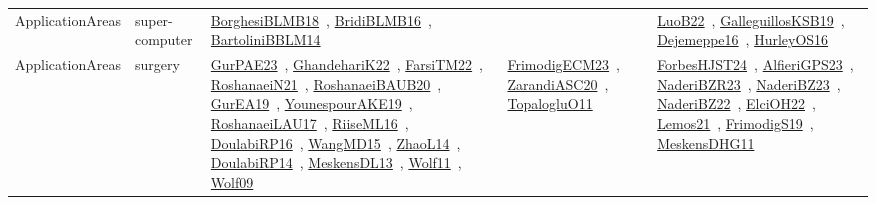 {\begin{longtable}{lp{3cm}>{\raggedright\arraybackslash}p{6cm}>{\raggedright\arraybackslash}p{6cm}>{\raggedright\arraybackslash}p{8cm}}
\index{super-computer}\index{ApplicationAreas!super-computer}ApplicationAreas & super-computer & \href{../works/BorghesiBLMB18.pdf}{BorghesiBLMB18}~\cite{BorghesiBLMB18}, \href{../works/BridiBLMB16.pdf}{BridiBLMB16}~\cite{BridiBLMB16}, \href{../works/BartoliniBBLM14.pdf}{BartoliniBBLM14}~\cite{BartoliniBBLM14} &  & \href{../works/LuoB22.pdf}{LuoB22}~\cite{LuoB22}, \href{../works/GalleguillosKSB19.pdf}{GalleguillosKSB19}~\cite{GalleguillosKSB19}, \href{../works/Dejemeppe16.pdf}{Dejemeppe16}~\cite{Dejemeppe16}, \href{../works/HurleyOS16.pdf}{HurleyOS16}~\cite{HurleyOS16}\\
\index{surgery}\index{ApplicationAreas!surgery}ApplicationAreas & surgery & \href{../works/GurPAE23.pdf}{GurPAE23}~\cite{GurPAE23}, \href{../works/GhandehariK22.pdf}{GhandehariK22}~\cite{GhandehariK22}, \href{../works/FarsiTM22.pdf}{FarsiTM22}~\cite{FarsiTM22}, \href{../works/RoshanaeiN21.pdf}{RoshanaeiN21}~\cite{RoshanaeiN21}, \href{../works/RoshanaeiBAUB20.pdf}{RoshanaeiBAUB20}~\cite{RoshanaeiBAUB20}, \href{../works/GurEA19.pdf}{GurEA19}~\cite{GurEA19}, \href{../works/YounespourAKE19.pdf}{YounespourAKE19}~\cite{YounespourAKE19}, \href{../works/RoshanaeiLAU17.pdf}{RoshanaeiLAU17}~\cite{RoshanaeiLAU17}, \href{../works/RiiseML16.pdf}{RiiseML16}~\cite{RiiseML16}, \href{../works/DoulabiRP16.pdf}{DoulabiRP16}~\cite{DoulabiRP16}, \href{../works/WangMD15.pdf}{WangMD15}~\cite{WangMD15}, \href{../works/ZhaoL14.pdf}{ZhaoL14}~\cite{ZhaoL14}, \href{../works/DoulabiRP14.pdf}{DoulabiRP14}~\cite{DoulabiRP14}, \href{../works/MeskensDL13.pdf}{MeskensDL13}~\cite{MeskensDL13}, \href{../works/Wolf11.pdf}{Wolf11}~\cite{Wolf11}, \href{../works/Wolf09.pdf}{Wolf09}~\cite{Wolf09} & \href{../works/FrimodigECM23.pdf}{FrimodigECM23}~\cite{FrimodigECM23}, \href{../works/ZarandiASC20.pdf}{ZarandiASC20}~\cite{ZarandiASC20}, \href{../works/TopalogluO11.pdf}{TopalogluO11}~\cite{TopalogluO11} & \href{../works/ForbesHJST24.pdf}{ForbesHJST24}~\cite{ForbesHJST24}, \href{../works/AlfieriGPS23.pdf}{AlfieriGPS23}~\cite{AlfieriGPS23}, \href{../works/NaderiBZR23.pdf}{NaderiBZR23}~\cite{NaderiBZR23}, \href{../works/NaderiBZ23.pdf}{NaderiBZ23}~\cite{NaderiBZ23}, \href{../works/NaderiBZ22.pdf}{NaderiBZ22}~\cite{NaderiBZ22}, \href{../works/ElciOH22.pdf}{ElciOH22}~\cite{ElciOH22}, \href{../works/Lemos21.pdf}{Lemos21}~\cite{Lemos21}, \href{../works/FrimodigS19.pdf}{FrimodigS19}~\cite{FrimodigS19}, \href{../works/MeskensDHG11.pdf}{MeskensDHG11}~\cite{MeskensDHG11}\\

\end{longtable}}
